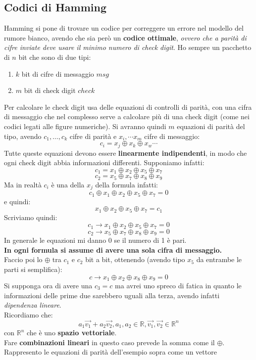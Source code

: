 \documentclass[a4paper,12pt, oneside]{book}
\begin{document}
\subsection{Codici di Hamming}
Hamming si pone di trovare un codice per correggere un errore nel modello del
rumore bianco, avendo che sia però un \textbf{codice ottimale}, \textit{ovvero
  che a parità di cifre inviate deve usare il minimo numero di check digit}.
Ho sempre un pacchetto di $n$ bit che sono di due tipi:
\begin{enumerate}
  \item $k$ bit di cifre di messaggio $msg$
  \item $m$ bit di check digit $check$
\end{enumerate}
Per calcolare le check digit usa delle equazioni di controlli di parità, con una
cifra di messaggio che nel complesso serve a calcolare più di una check digit
(come nei codici legati alle figure numeriche). Si avranno quindi $m$ equazioni
di parità del tipo, avendo $c_1,\ldots,c_k$ cifre di parità e $x_i,\cdots x_m$
cifre di messaggio:
\[c_i=x_j\oplus x_k\oplus x_w \cdots\]
Tutte queste equazioni devono essere \textbf{linearmente indipendenti}, in modo
che ogni check digit abbia informazioni differenti. Supponiamo infatti:
\[c_1=x_1\oplus x_2\oplus x_5 \oplus x_7\]
\[c_2=x_5\oplus x_7\oplus x_8 \oplus x_9\]
Ma in realtà $c_i$ è una della $x_j$ della formula infatti:
\[c_1\oplus x_1\oplus x_2\oplus x_5 \oplus x_7=0\]
e quindi:
\[x_1\oplus x_2\oplus x_5 \oplus x_7=c_1\]
Scriviamo quindi:
\[c_1\to x_1\oplus x_2\oplus x_5 \oplus x_7=0\]
\[c_2\to x_5\oplus x_7\oplus x_8 \oplus x_9=0\]
In generale le equazioni mi danno 0 se il numero di 1 è pari.\\
\textbf{In ogni formula si assume di avere una sola cifra di messaggio.}\\
Faccio poi lo $\oplus$ tra $c_1$ e $c_2$ bit a bit, ottenendo (avendo tipo $x_5$
da entrambe le parti si semplifica):
\[c\to x_1\oplus x_2\oplus x_8\oplus x_9=0\]
Si supponga ora di avere una $c_3=c$ ma avrei uno spreco di fatica in quanto le
informazioni delle prime due sarebbero uguali alla terza, avendo infatti
\textit{dipendenza lineare}.\\
Ricordiamo che:
\[a_1\vec{v_1}+a_2\vec{v_2},a_1,a_2\in \mathbb{R}, \vec{v_1},\vec{v_2}\in
  \mathbb{R}^n\]
con $\mathbb{R}^n$ che è uno \textbf{spazio vettoriale}.\\
Fare \textbf{combinazioni lineari} in questo caso prevede la somma come il
$\oplus$. Rappresento le equazioni di parità dell'esempio sopra come un vettore
\end{document}
